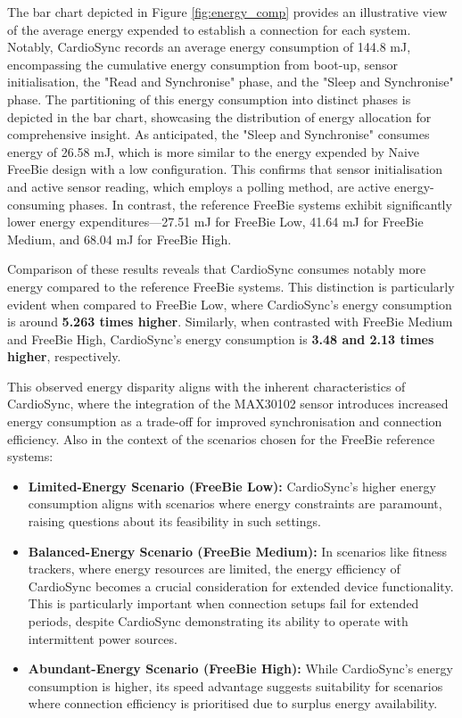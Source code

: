 \noindent The bar chart depicted in Figure \ref{fig:energy_comp} provides an illustrative view of the average energy expended to establish a connection for each system. Notably, CardioSync records an average energy consumption of 144.8 mJ, encompassing the cumulative energy consumption from boot-up, sensor initialisation, the "Read and Synchronise" phase, and the "Sleep and Synchronise" phase. The partitioning of this energy consumption into distinct phases is depicted in the bar chart, showcasing the distribution of energy allocation for comprehensive insight. As anticipated, the "Sleep and Synchronise" consumes energy of 26.58 mJ, which is more similar to the energy expended by Naive FreeBie design with a low configuration. This confirms that sensor initialisation and active sensor reading, which employs a polling method, are active energy-consuming phases. In contrast, the reference FreeBie systems exhibit significantly lower energy expenditures—27.51 mJ for FreeBie Low, 41.64 mJ for FreeBie Medium, and 68.04 mJ for FreeBie High.
\vspace{1\baselineskip}

\noindent Comparison of these results reveals that CardioSync consumes notably more energy compared to the reference FreeBie systems. This distinction is particularly evident when compared to FreeBie Low, where CardioSync's energy consumption is around \textbf{5.263 times higher}. Similarly, when contrasted with FreeBie Medium and FreeBie High, CardioSync's energy consumption is \textbf{3.48 and 2.13 times higher}, respectively.
\vspace{1\baselineskip}

\noindent This observed energy disparity aligns with the inherent characteristics of CardioSync, where the integration of the MAX30102 sensor introduces increased energy consumption as a trade-off for improved synchronisation and connection efficiency. Also in the context of the scenarios chosen for the FreeBie reference systems:

\begin{itemize}
    \item \textbf{Limited-Energy Scenario (FreeBie Low):} CardioSync's higher energy consumption aligns with scenarios where energy constraints are paramount, raising questions about its feasibility in such settings.
    
    \item \textbf{Balanced-Energy Scenario (FreeBie Medium):} In scenarios like fitness trackers, where energy resources are limited, the energy efficiency of CardioSync becomes a crucial consideration for extended device functionality. This is particularly important when connection setups fail for extended periods, despite CardioSync demonstrating its ability to operate with intermittent power sources.
    
    \item \textbf{Abundant-Energy Scenario (FreeBie High):} While CardioSync's energy consumption is higher, its speed advantage suggests suitability for scenarios where connection efficiency is prioritised due to surplus energy availability.
\end{itemize}

